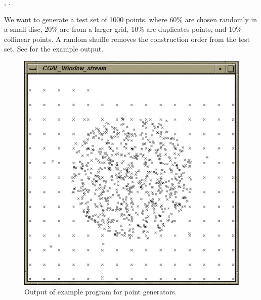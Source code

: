\ccSeeAlso

, .

\ccExample

We want to generate a test set of 1000 points, where 60\% are chosen
randomly in a small disc, 20\% are from a larger grid, 10\% are duplicates
points, and 10\% collinear points. A random shuffle removes the
construction order from the test set. See  for the example output.


\begin{ccTexOnly}
  \begin{figure}
    \noindent
    \hspace*{0.025\textwidth}%
    \begin{minipage}{0.45\textwidth}%
      \includegraphics[width=\textwidth]{generators_prog1.ps}
      \caption{Output of example program for point generators.}
      \label{figurePointGenerator}
    \end{minipage}%
    \hspace*{0.05\textwidth}%
    \begin{minipage}{0.45\textwidth}%

\end{minipage}
\end{figure}
\end{ccTexOnly}
